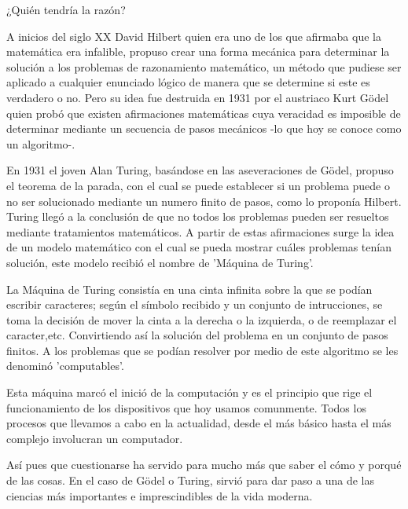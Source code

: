 \documentclass{article}
\begin{document}
¿Quién tendría la razón?

\vspace{10PT}

A inicios del siglo XX David Hilbert quien era uno de los que afirmaba que la matemática era infalible, propuso crear una forma mecánica para determinar la solución a los problemas de razonamiento matemático, un método que pudiese ser aplicado a cualquier enunciado lógico de manera que se determine si este es verdadero o no. Pero su idea fue destruida en 1931 por el austriaco Kurt Gödel quien probó que existen afirmaciones matemáticas cuya veracidad es imposible de determinar mediante un secuencia de pasos mecánicos -lo que hoy se conoce como un algoritmo-.

\vspace{10PT}

En 1931 el joven Alan Turing, basándose en las aseveraciones de Gödel, propuso el teorema de la parada, con el cual se puede establecer si un problema puede o no ser solucionado mediante un numero finito de pasos, como lo proponía Hilbert. Turing llegó a la conclusión de que no todos los problemas pueden ser resueltos mediante tratamientos matemáticos. 
A partir de estas afirmaciones surge la idea de un modelo matemático con el cual se pueda mostrar cuáles problemas tenían solución, este modelo recibió el nombre de 'Máquina de Turing'.

\vspace{10PT}

La Máquina de Turing consistía en una cinta infinita sobre la que se podían escribir caracteres; según el símbolo recibido y un conjunto de intrucciones, se toma la decisión de mover la cinta a la derecha o la izquierda, o de reemplazar el caracter,etc. Convirtiendo así la solución del problema en un conjunto de pasos finitos. A los problemas que se podían resolver por medio de este algoritmo se les denominó 'computables'. 

\vspace{10PT}

Esta máquina marcó el inició de la computación y es el principio que rige el funcionamiento de los dispositivos que hoy usamos comunmente. Todos los procesos que llevamos a cabo en la actualidad, desde el más básico hasta el más complejo involucran un computador. 

\vspace{10PT}

Así pues que cuestionarse ha servido para mucho más que saber el cómo y porqué de las cosas. En el caso de Gödel o Turing, sirvió para dar paso a una de las ciencias más importantes e imprescindibles de la vida moderna.
\end{document}
